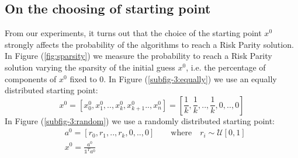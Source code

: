 \subsection{On the choosing of starting point}
From our experiments, it turns out that the choice of the starting point $x^0$ strongly affects the probability of the algorithms to reach a Risk Parity solution.  In Figure (\ref{fig:sparsity}) we measure the probability to reach a Risk Parity solution varying the sparsity of the initial guess $x^0$, i.e. the percentage of components of $x^0$ fixed to 0. In Figure (\ref{subfig-3:equally}) we use an equally distributed starting point:
\begin{equation}
x^{0} = \left[x^{0}_0, x^{0}_1, .. ,  x^{0}_k, x^{0}_{k+1} .., x^{0}_n \right] = \left[\frac{1}{k}, \frac{1}{k}, .., \frac{1}{k}, 0, .., 0 \right]
\end{equation}
In Figure (\ref{subfig-3:random}) we use a randomly distributed starting point:
\begin{equation}
\begin{aligned}
&a^{0} = \left[r_0, r_1, ..,r_k, 0, .., 0 \right] \qquad \text{where} \quad r_i \sim \mathcal{U}[0,1]\\
&x^0 = \frac{a^{0}}{\mathds{1}^T a^0}
\end{aligned}
\end{equation}


